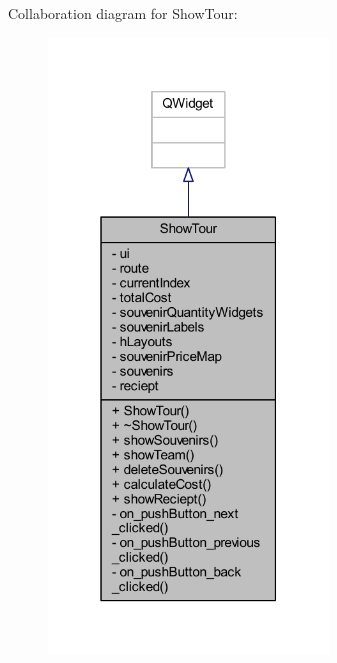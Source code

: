 Collaboration diagram for Show\+Tour\+:
\nopagebreak
\begin{figure}[H]
\begin{center}
\leavevmode
\includegraphics[width=211pt]{class_show_tour__coll__graph}
\end{center}
\end{figure}
